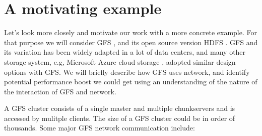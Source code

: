 \section{A motivating example}
\label{section:motivation}

Let's look more closely and motivate our work with a more concrete example. 
For that purpose we will consider GFS \cite{gfs}, and its open source version HDFS \cite{hdfs}. GFS and its variation has been widely adapted in a lot of data centers, and many other storage system, e.g, Microsoft Azure cloud storage \cite{azure-storage}, adopted similar design options with GFS. We will briefly describe how GFS uses network, and identify potential performance boost we could get using an understanding of the nature of the interaction of GFS and network.

A GFS cluster consists of a single master and multiple chunkservers and is accessed by mulitple clients. The size of a GFS cluster could be in order of thousands. Some major GFS network communication include:

